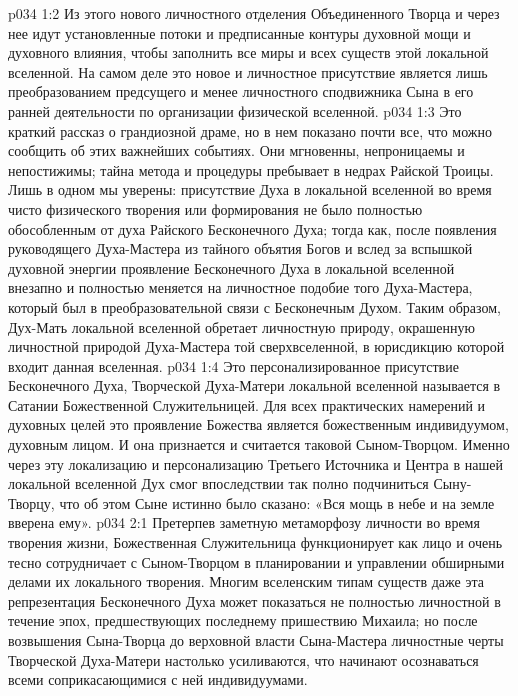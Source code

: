 \vs p034 1:2 Из этого нового личностного отделения Объединенного Творца и через нее идут установленные потоки и предписанные контуры духовной мощи и духовного влияния, чтобы заполнить все миры и всех существ этой локальной вселенной. На самом деле это новое и личностное присутствие является лишь преобразованием предсущего и менее личностного сподвижника Сына в его ранней деятельности по организации физической вселенной.
\vs p034 1:3 \pc Это краткий рассказ о грандиозной драме, но в нем показано почти все, что можно сообщить об этих важнейших событиях. Они мгновенны, непроницаемы и непостижимы; тайна метода и процедуры пребывает в недрах Райской Троицы. Лишь в одном мы уверены: присутствие Духа в локальной вселенной во время чисто физического творения или формирования не было полностью обособленным от духа Райского Бесконечного Духа; тогда как, после появления руководящего Духа\hyp{}Мастера из тайного объятия Богов и вслед за вспышкой духовной энергии проявление Бесконечного Духа в локальной вселенной внезапно и полностью меняется на личностное подобие того Духа\hyp{}Мастера, который был в преобразовательной связи с Бесконечным Духом. Таким образом, Дух\hyp{}Мать локальной вселенной обретает личностную природу, окрашенную личностной природой Духа\hyp{}Мастера той сверхвселенной, в юрисдикцию которой входит данная вселенная.
\vs p034 1:4 Это персонализированное присутствие Бесконечного Духа, Творческой Духа\hyp{}Матери локальной вселенной называется в Сатании Божественной Служительницей. Для всех практических намерений и духовных целей это проявление Божества является божественным индивидуумом, духовным лицом. И она признается и считается таковой Сыном\hyp{}Творцом. Именно через эту локализацию и персонализацию Третьего Источника и Центра в нашей локальной вселенной Дух смог впоследствии так полно подчиниться Сыну\hyp{}Творцу, что об этом Сыне истинно было сказано: «Вся мощь в небе и на земле вверена ему».
\vs p034 2:1 Претерпев заметную метаморфозу личности во время творения жизни, Божественная Служительница функционирует как лицо и очень тесно сотрудничает с Сыном\hyp{}Творцом в планировании и управлении обширными делами их локального творения. Многим вселенским типам существ даже эта репрезентация Бесконечного Духа может показаться не полностью личностной в течение эпох, предшествующих последнему пришествию Михаила; но после возвышения Сына\hyp{}Творца до верховной власти Сына\hyp{}Мастера личностные черты Творческой Духа\hyp{}Матери настолько усиливаются, что начинают осознаваться всеми соприкасающимися с ней индивидуумами.
